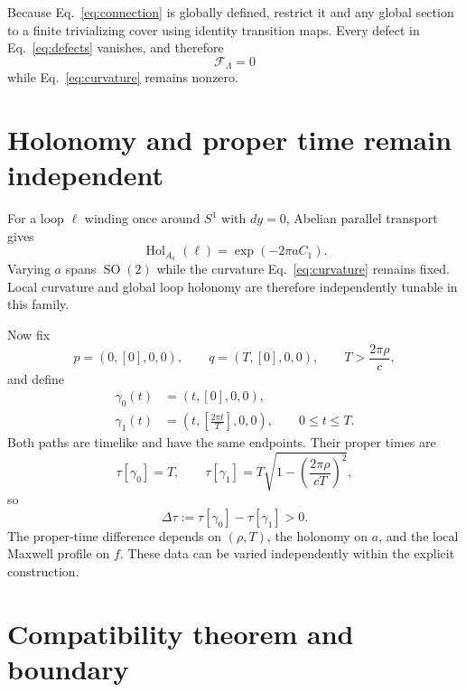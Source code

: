 \documentclass[aps,prd,reprint,nofootinbib,superscriptaddress]{revtex4-2}
\newcommand{\SO}{\operatorname{SO}}
\newcommand{\Hol}{\operatorname{Hol}}
\begin{document}
Because Eq.~\eqref{eq:connection} is globally defined, restrict it and any global section to a finite trivializing cover using identity transition maps. Every defect in Eq.~\eqref{eq:defects} vanishes, and therefore
\begin{equation}
\boxed{\mathcal F_{\Lambda}=0}
\label{eq:glued}
\end{equation}
while Eq.~\eqref{eq:curvature} remains nonzero.

\section{Holonomy and proper time remain independent}

For a loop $\ell$ winding once around $S^1$ with $dy=0$, Abelian parallel transport gives
\begin{equation}
\boxed{
\Hol_{A_a}(\ell)
=
\exp(-2\pi a C_1).
}
\label{eq:holonomy}
\end{equation}
Varying $a$ spans $\SO(2)$ while the curvature Eq.~\eqref{eq:curvature} remains fixed. Local curvature and global loop holonomy are therefore independently tunable in this family.

Now fix
\begin{equation}
p=(0,[0],0,0),
\qquad
q=(T,[0],0,0),
\qquad
T>\frac{2\pi\rho}{c},
\end{equation}
and define
\begin{align}
\gamma_0(t)&=(t,[0],0,0),\\
\gamma_1(t)&=\left(t,\left[\frac{2\pi t}{T}\right],0,0\right),
\qquad 0\le t\le T.
\end{align}
Both paths are timelike and have the same endpoints. Their proper times are
\begin{equation}
\tau[\gamma_0]=T,
\qquad
\tau[\gamma_1]
=T\sqrt{1-\left(\frac{2\pi\rho}{cT}\right)^2},
\end{equation}
so
\begin{equation}
\boxed{\Delta\tau:=\tau[\gamma_0]-\tau[\gamma_1]>0.}
\label{eq:proper}
\end{equation}
The proper-time difference depends on $(\rho,T)$, the holonomy on $a$, and the local Maxwell profile on $f$. These data can be varied independently within the explicit construction.

\section{Compatibility theorem and boundary}
\end{document}
